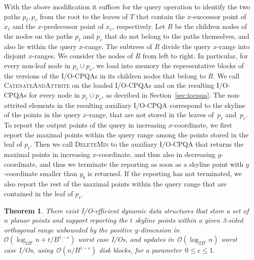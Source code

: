 \documentclass[]{article}
\newcommand{\bigO}{\mathcal{O}}
\newtheorem{theorem}{Theorem}[section]
\begin{document}
With the above modification it suffices for the query operation to identify the
two paths $p_\ell, p_r$ from the root to the leaves of $T$ that contain the
$x$-successor point of $x_\ell$ and the $x$-predecessor point of $x_r$,
respectively. Let $R$ be the children nodes of the nodes on the paths $p_\ell$
and $p_r$ that do not belong to the paths themselves, and also lie within the
query $x$-range. The subtrees of $R$ divide the query $x$-range into disjoint
$x$-ranges. We consider the nodes of $R$ from left to right. In particular,
for every non-leaf node in $p_\ell \cup p_r$, we load into memory the
representative blocks of the versions of the I/O-CPQAs in its children nodes
that belong to $R$. We call \textsc{CatenateAndAttrite} on the loaded I/O-CPQAs
and on the resulting I/O-CPQAs for every node in $p_\ell \cup p_r$, as decribed
in Section~\ref{sec:iocpqa}. The non-attrited elements in the resulting
auxiliary I/O-CPQA correspond to the skyline of the points in the query
$x$-range, that are not stored in the leaves of~$p_\ell$ and~$p_r$. To report
the output points of the query in increasing $x$-coordinate, we first report the
maximal points within the query range among the points stored in the leaf of
$p_\ell$. Then we call \textsc{DeleteMin} to the auxiliary I/O-CPQA that returns
the maximal points in increasing $x$-coordinate, and thus also in decreasing
$y$-coordinate, and thus we terminate the reporting as soon as a skyline point
with $y$-coordinate smaller than $y_b$ is returned. If the reporting has not
terminated, we also report the rest of the maximal points within the query range
that are contained in the leaf of $p_r$.
\begin{theorem} \label{thm:3sided}
  There exist I/O-efficient dynamic data structures that store a set of $n$
  planar points and support reporting the $t$ skyline points within a given
  3-sided orthogonal range unbounded by the positive $y$-dimension in~$\bigO
  (\log_{2B^{\epsilon}} n + t/B^{1-\epsilon})$ worst case I/Os, and updates
  in~$\bigO(\log_{2B^{\epsilon}} n)$ worst case I/Os, using~$\bigO
  (n/B^{1-\epsilon})$ disk blocks, for a parameter~$0 \leq \epsilon \leq 1$.
\end{theorem}
\end{document}
